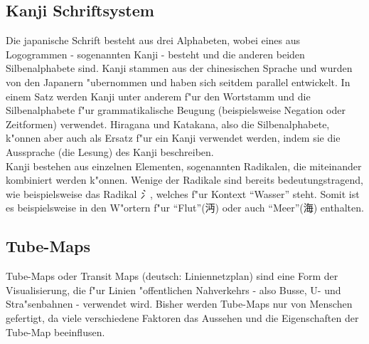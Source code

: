 \subsection{Kanji Schriftsystem}
Die japanische Schrift besteht aus drei Alphabeten, wobei eines aus Logogrammen - sogenannten Kanji - besteht und die anderen beiden Silbenalphabete sind. Kanji stammen aus der chinesischen Sprache und wurden von den Japanern "ubernommen und haben sich seitdem parallel entwickelt. In einem Satz werden Kanji unter anderem f"ur den Wortstamm und die Silbenalphabete f"ur grammatikalische Beugung (beispielsweise Negation oder Zeitformen) verwendet. Hiragana und Katakana, also die Silbenalphabete, k"onnen aber auch als Ersatz f"ur ein Kanji verwendet werden, indem sie die Aussprache (die Lesung) des Kanji beschreiben. \\
Kanji bestehen aus einzelnen Elementen, sogenannten Radikalen, die miteinander kombiniert werden k"onnen. Wenige der Radikale sind bereits bedeutungstragend, wie beispielsweise das Radikal \emph{氵}, welches f"ur Kontext "`Wasser"' steht. Somit ist es beispielsweise in den W"ortern f"ur "`Flut"'(沔) oder auch "`Meer"'(海) enthalten. 

\subsection{Tube-Maps}
Tube-Maps oder Transit Maps (deutsch: Liniennetzplan) sind eine Form der Visualisierung, die f"ur Linien "offentlichen Nahverkehrs - also Busse, U- und Stra"senbahnen - verwendet wird. Bisher werden Tube-Maps nur von Menschen gefertigt, da viele verschiedene Faktoren das Aussehen und die Eigenschaften der Tube-Map beeinflusen.  
